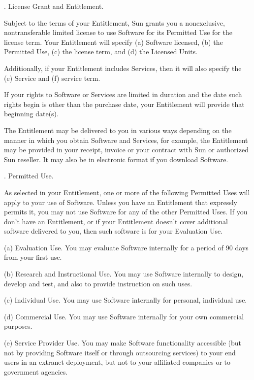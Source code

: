 \bigskip 
\par {}.      License Grant and Entitlement.
\bigskip 
\par \noindent Subject to the terms of your Entitlement, Sun grants you a nonexclusive, nontransferable limited license to use Software for its Permitted Use for the license term. Your Entitlement will specify (a) Software licensed, (b) the Permitted Use, (c) the license term, and (d) the Licensed Units. 
\bigskip 
\par \noindent Additionally, if your Entitlement includes Services, then it will also specify the (e) Service and (f) service term. 
\bigskip 
\par \noindent If your rights to Software or Services are limited in duration and the date such rights begin is other than the purchase date, your Entitlement will provide that beginning date(s).
\bigskip 
\par \noindent The Entitlement may be delivered to you in various ways depending on the manner in which you obtain Software and Services, for example, the Entitlement may be provided in your receipt, invoice or your contract with Sun or authorized Sun reseller. It may also be in electronic format if you download Software.
\bigskip 
\par {}.      Permitted Use.
\bigskip 
\par \noindent As selected in your Entitlement, one or more of the following Permitted Uses will apply to your use of Software. Unless you have an Entitlement that expressly permits it, you may not use Software for any of the other Permitted Uses. If you don't have an Entitlement, or if your Entitlement doesn't cover additional software delivered to you, then such software is for your Evaluation Use.
\bigskip 
\par \noindent (a) Evaluation Use. You may evaluate Software internally for a period of 90 days from your first use. 
\bigskip 
\par \noindent (b) Research and Instructional Use. You may use Software internally to design, develop and test, and also to provide instruction on such uses.
\bigskip 
\par \noindent (c) Individual Use. You may use Software internally for personal, individual use.
\bigskip 
\par \noindent (d) Commercial Use. You may use Software internally for your own commercial purposes. 
\bigskip 
\par \noindent (e) Service Provider Use. You may make Software functionality accessible (but not by providing Software itself or through outsourcing services) to your end users in an extranet deployment, but not to your affiliated companies or to government agencies.
